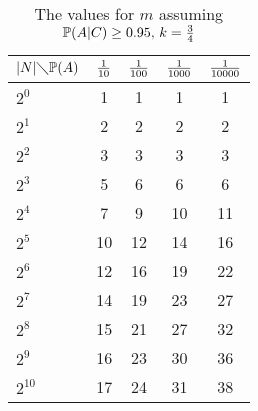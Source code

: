 \documentclass[11pt]{article}
\renewcommand{\P}{\mathbb{P}}
\begin{document}
    \begin{table}[H]
        \centering
        \caption{The values for $m$ assuming $\P(A|C) \ge 0.95,\, k = {3 \over 4}$}
        \label{tbl:k_3_4}
        \begin{tabular}{lcccc}
            \toprule
            $|N| \diagdown \P(A)$ & ${1 \over 10 }$ & ${1 \over 100 }$ & ${1 \over 1000 }$ & ${1 \over 10000 }$\\
            \midrule
            $2^0$               & 1               & 1                & 1                 & 1\\
            $2^1$               & 2               & 2                & 2                 & 2\\
            $2^2$               & 3               & 3                & 3                 & 3\\
            $2^3$               & 5               & 6                & 6                 & 6\\
            $2^4$               & 7               & 9                & 10                & 11\\
            $2^5$               & 10              & 12               & 14                & 16\\
            $2^6$               & 12              & 16               & 19                & 22\\
            $2^7$               & 14              & 19               & 23                & 27\\
            $2^8$               & 15              & 21               & 27                & 32\\
            $2^9$               & 16              & 23               & 30                & 36\\
            $2^{10}$            & 17              & 24               & 31                & 38\\
            \bottomrule
        \end{tabular}
    \end{table}
\end{document}
